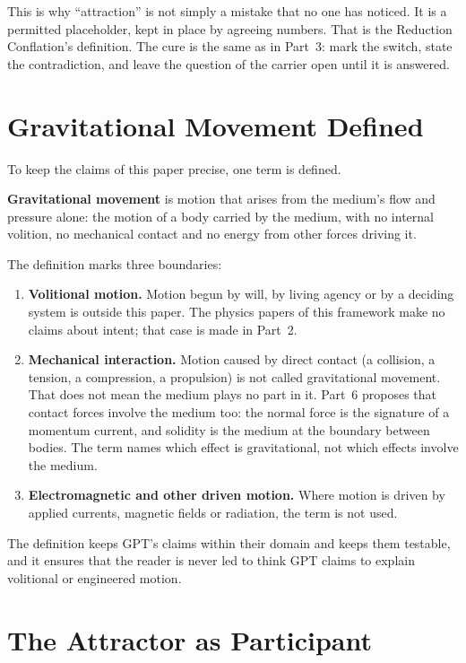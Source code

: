 \documentclass[11pt,a4paper]{article}
\begin{document}
This is why ``attraction'' is not simply a mistake that no one has noticed. It is a permitted placeholder, kept in place by agreeing numbers. That is the Reduction Conflation's definition. The cure is the same as in Part~3: mark the switch, state the contradiction, and leave the question of the carrier open until it is answered.

\section{Gravitational Movement Defined}
\label{sec:gm}

To keep the claims of this paper precise, one term is defined.

\textbf{Gravitational movement} is motion that arises from the medium's flow and pressure alone: the motion of a body carried by the medium, with no internal volition, no mechanical contact and no energy from other forces driving it.

The definition marks three boundaries:
\begin{enumerate}
    \item \textbf{Volitional motion.} Motion begun by will, by living agency or by a deciding system is outside this paper. The physics papers of this framework make no claims about intent; that case is made in Part~2.
    \item \textbf{Mechanical interaction.} Motion caused by direct contact (a collision, a tension, a compression, a propulsion) is not called gravitational movement. That does not mean the medium plays no part in it. Part~6 proposes that contact forces involve the medium too: the normal force is the signature of a momentum current, and solidity is the medium at the boundary between bodies. The term names which effect is gravitational, not which effects involve the medium.
    \item \textbf{Electromagnetic and other driven motion.} Where motion is driven by applied currents, magnetic fields or radiation, the term is not used.
\end{enumerate}

The definition keeps GPT's claims within their domain and keeps them testable, and it ensures that the reader is never led to think GPT claims to explain volitional or engineered motion.

\section{The Attractor as Participant}
\end{document}
